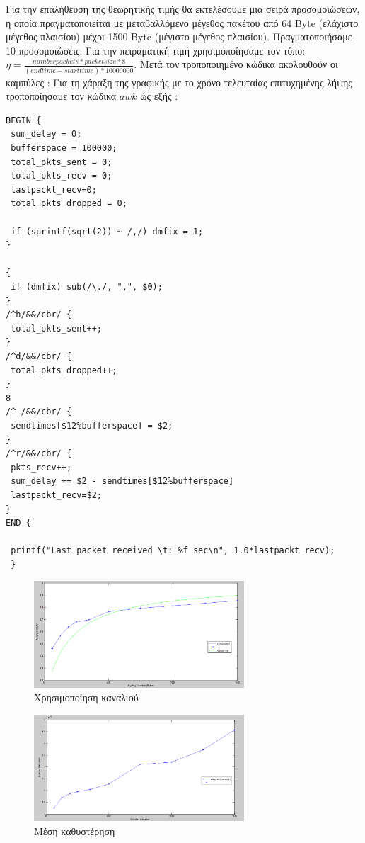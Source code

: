 \documentclass{article}%
\begin{document}
Για την επαλήθευση της θεωρητικής τιμής θα εκτελέσουμε μια σειρά προσομοιώσεων, η  οποία πραγματοποιείται με μεταβαλλόμενο μέγεθος πακέτου από \textlatin{64 Byte} (ελάχιστο μέγεθος πλαισίου) μέχρι \textlatin{1500 Byte} (μέγιστο μέγεθος πλαισίου). Πραγματοποιήσαμε 10 προσομοιώσεις. Για την πειραματική τιμή χρησιμοποίησαμε τον τύπο:
$\eta = \frac{numberpackets*packetsize*8}{(endtime-starttime)*10000000}$.
\newpage 
Μετά τον τροποποιημένο κώδικα ακολουθούν οι καμπύλες :
Για τη χάραξη της γραφικής με το χρόνο τελευταίας επιτυχημένης λήψης τροποποίησαμε τον κώδικα $awk$ ώς εξής :\\
\begin{verbatim}
BEGIN {
 sum_delay = 0;
 bufferspace = 100000;
 total_pkts_sent = 0;
 total_pkts_recv = 0;
 lastpackt_recv=0;
 total_pkts_dropped = 0;

 if (sprintf(sqrt(2)) ~ /,/) dmfix = 1;
}

{
 if (dmfix) sub(/\./, ",", $0);
}
/^h/&&/cbr/ {
 total_pkts_sent++;
}
/^d/&&/cbr/ {
 total_pkts_dropped++;
} 
8
/^-/&&/cbr/ {
 sendtimes[$12%bufferspace] = $2;
}
/^r/&&/cbr/ {
 pkts_recv++;
 sum_delay += $2 - sendtimes[$12%bufferspace]
 lastpackt_recv=$2;
}
END {

 printf("Last packet received \t: %f sec\n", 1.0*lastpackt_recv);
 } 
\end{verbatim}


\begin{figure}[htbp]
	\centering
		\includegraphics[width=0.7\textwidth]{1.png}
	\caption{Χρησιμοποίηση καναλιού}
	\label{fig:1}
\end{figure}

\begin{figure}[htbp]
	\centering
		\includegraphics[width=0.7\textwidth]{2.png}
	\caption{Μέση καθυστέρηση}
	\label{fig:2}
\end{figure}
\end{document}
